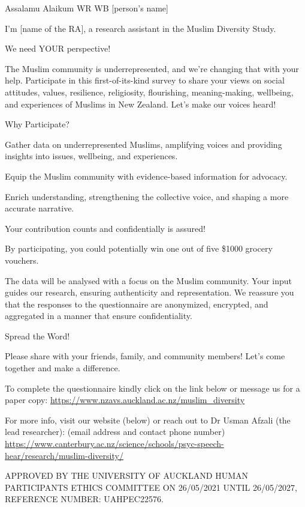 \documentclass[
]{interact}
\begin{document}
\noindent Assalamu Alaikum WR WB {[}person's name{]}

\noindent I'm {[}name of the RA{]}, a research assistant in the Muslim
Diversity Study.

\noindent We need YOUR perspective!

\noindent The Muslim community is underrepresented, and we're changing
that with your help. Participate in this first-of-its-kind survey to
share your views on social attitudes, values, resilience, religiosity,
flourishing, meaning-making, wellbeing, and experiences of Muslims in
New Zealand. Let's make our voices heard!

\noindent Why Participate?

\noindent Gather data on underrepresented Muslims, amplifying voices and
providing insights into issues, wellbeing, and experiences.

\noindent Equip the Muslim community with evidence-based information for
advocacy.

\noindent Enrich understanding, strengthening the collective voice, and
shaping a more accurate narrative.

\noindent Your contribution counts and confidentially is assured!

\noindent By participating, you could potentially win one out of five
\$1000 grocery vouchers.

\noindent The data will be analysed with a focus on the Muslim
community. Your input guides our research, ensuring authenticity and
representation. We reassure you that the responses to the questionnaire
are anonymized, encrypted, and aggregated in a manner that ensure
confidentiality.

\noindent Spread the Word!

\noindent Please share with your friends, family, and community members!
Let's come together and make a difference.

\noindent To complete the questionnaire kindly click on the link below
or message us for a paper copy:
\url{https://www.nzavs.auckland.ac.nz/muslim_diversity}

\noindent For more info, visit our website (below) or reach out to Dr
Usman Afzali (the lead researcher): (email address and contact phone
number)
\url{https://www.canterbury.ac.nz/science/schools/psyc-speech-hear/research/muslim-diversity/}

\noindent APPROVED BY THE UNIVERSITY OF AUCKLAND HUMAN PARTICIPANTS
ETHICS COMMITTEE ON 26/05/2021 UNTIL 26/05/2027, REFERENCE NUMBER:
UAHPEC22576.
\end{document}
